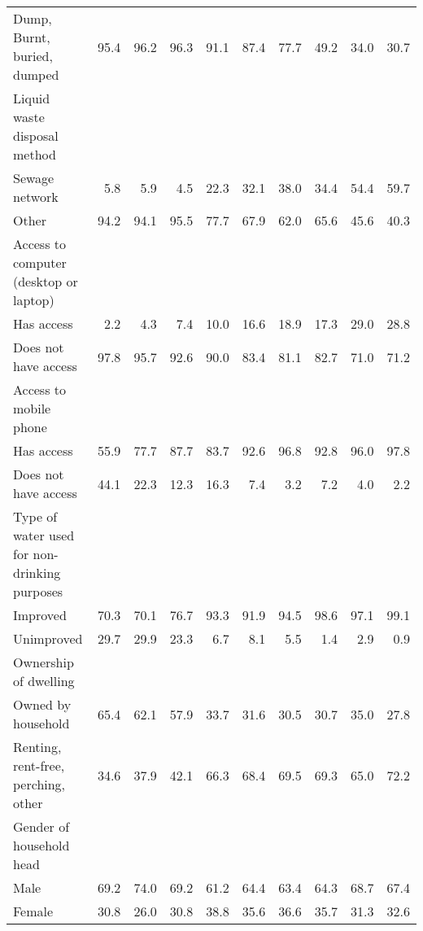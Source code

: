 \begin{tabular}{l r r r r r r r r r}
\hspace{6mm} Dump, Burnt, buried, dumped  &  95.4  &  96.2  &  96.3  &  91.1  &  87.4  &  77.7  &  49.2  &  34.0  &  30.7 \\
Liquid waste disposal method &&&&&&&&&\\
\hspace{6mm} Sewage network  &  5.8  &  5.9  &  4.5  &  22.3  &  32.1  &  38.0  &  34.4  &  54.4  &  59.7 \\
\hspace{6mm} Other  &  94.2  &  94.1  &  95.5  &  77.7  &  67.9  &  62.0  &  65.6  &  45.6  &  40.3 \\
Access to computer (desktop or laptop) &&&&&&&&&\\
\hspace{6mm} Has access  &  2.2  &  4.3  &  7.4  &  10.0  &  16.6  &  18.9  &  17.3  &  29.0  &  28.8 \\
\hspace{6mm} Does not have access  &  97.8  &  95.7  &  92.6  &  90.0  &  83.4  &  81.1  &  82.7  &  71.0  &  71.2 \\
Access to mobile phone &&&&&&&&&\\
\hspace{6mm} Has access  &  55.9  &  77.7  &  87.7  &  83.7  &  92.6  &  96.8  &  92.8  &  96.0  &  97.8 \\
\hspace{6mm} Does not have access  &  44.1  &  22.3  &  12.3  &  16.3  &  7.4  &  3.2  &  7.2  &  4.0  &  2.2 \\
Type of water used for non-drinking purposes &&&&&&&&&\\
\hspace{6mm} Improved  &  70.3  &  70.1  &  76.7  &  93.3  &  91.9  &  94.5  &  98.6  &  97.1  &  99.1 \\
\hspace{6mm} Unimproved  &  29.7  &  29.9  &  23.3  &  6.7  &  8.1  &  5.5  &  1.4  &  2.9  &  0.9 \\
Ownership of dwelling &&&&&&&&&\\
\hspace{6mm} Owned by household  &  65.4  &  62.1  &  57.9  &  33.7  &  31.6  &  30.5  &  30.7  &  35.0  &  27.8 \\
\hspace{6mm} Renting, rent-free, perching, other  &  34.6  &  37.9  &  42.1  &  66.3  &  68.4  &  69.5  &  69.3  &  65.0  &  72.2 \\
Gender of household head &&&&&&&&&\\
\hspace{6mm} Male  &  69.2  &  74.0  &  69.2  &  61.2  &  64.4  &  63.4  &  64.3  &  68.7  &  67.4 \\
\hspace{6mm} Female  &  30.8  &  26.0  &  30.8  &  38.8  &  35.6  &  36.6  &  35.7  &  31.3  &  32.6 \\
\bottomrule
\end{tabular}
